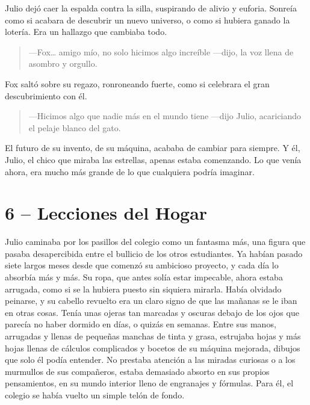 \documentclass[a4paper,12pt]{book}
\begin{document}
Julio dejó caer la espalda contra la silla, suspirando de alivio y euforia. Sonreía como si acabara de descubrir un nuevo universo, o como si hubiera ganado la lotería. Era un hallazgo que cambiaba todo.

\begin{quote}
    —Fox… amigo mío, no solo hicimos algo increíble —dijo, la voz llena de asombro y orgullo.
\end{quote}

Fox saltó sobre su regazo, ronroneando fuerte, como si celebrara el gran descubrimiento con él.

\begin{quote}
    —Hicimos algo que nadie más en el mundo tiene —dijo Julio, acariciando el pelaje blanco del gato.
\end{quote}

El futuro de su invento, de su máquina, acababa de cambiar para siempre. Y él, Julio, el chico que miraba las estrellas, apenas estaba comenzando. Lo que venía ahora, era mucho más grande de lo que cualquiera podría imaginar.

\cleardoublepage %

\chapter*{6 – Lecciones del Hogar}

Julio caminaba por los pasillos del colegio como un fantasma más, una figura que pasaba desapercibida entre el bullicio de los otros estudiantes. Ya habían pasado siete largos meses desde que comenzó su ambicioso proyecto, y cada día lo absorbía más y más. Su ropa, que antes solía estar impecable, ahora estaba arrugada, como si se la hubiera puesto sin siquiera mirarla. Había olvidado peinarse, y su cabello revuelto era un claro signo de que las mañanas se le iban en otras cosas. Tenía unas ojeras tan marcadas y oscuras debajo de los ojos que parecía no haber dormido en días, o quizás en semanas. Entre sus manos, arrugadas y llenas de pequeñas manchas de tinta y grasa, estrujaba hojas y más hojas llenas de cálculos complicados y bocetos de su máquina mejorada, dibujos que solo él podía entender. No prestaba atención a las miradas curiosas o a los murmullos de sus compañeros, estaba demasiado absorto en sus propios pensamientos, en su mundo interior lleno de engranajes y fórmulas. Para él, el colegio se había vuelto un simple telón de fondo.
\end{document}

